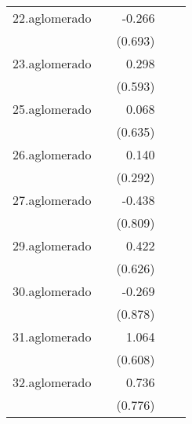{\begin{longtable}{l*{4}{D{.}{.}{-1}}}
\addlinespace
22.aglomerado&                     &      -0.266         &                     &                     \\
            &                     &     (0.693)         &                     &                     \\
\addlinespace
23.aglomerado&                     &       0.298         &                     &                     \\
            &                     &     (0.593)         &                     &                     \\
\addlinespace
25.aglomerado&                     &       0.068         &                     &                     \\
            &                     &     (0.635)         &                     &                     \\
\addlinespace
26.aglomerado&                     &       0.140         &                     &                     \\
            &                     &     (0.292)         &                     &                     \\
\addlinespace
27.aglomerado&                     &      -0.438         &                     &                     \\
            &                     &     (0.809)         &                     &                     \\
\addlinespace
29.aglomerado&                     &       0.422         &                     &                     \\
            &                     &     (0.626)         &                     &                     \\
\addlinespace
30.aglomerado&                     &      -0.269         &                     &                     \\
            &                     &     (0.878)         &                     &                     \\
\addlinespace
31.aglomerado&                     &       1.064         &                     &                     \\
            &                     &     (0.608)         &                     &                     \\
\addlinespace
32.aglomerado&                     &       0.736         &                     &                     \\
            &                     &     (0.776)         &                     &                     \\

\end{longtable}}
